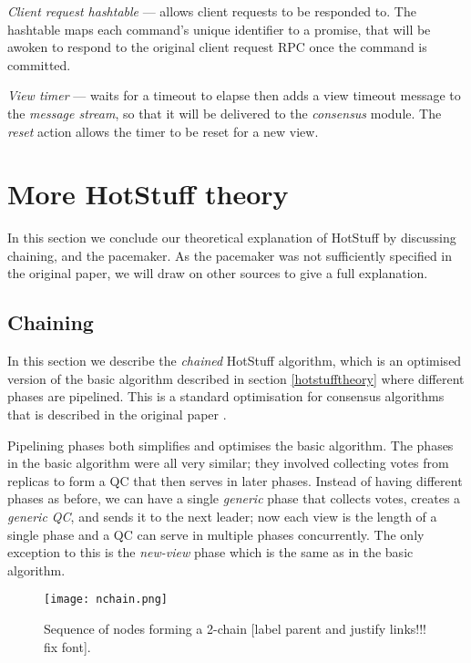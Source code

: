 \begin{description}
	\item \textit{Client request hashtable} --- allows client requests to be responded to. The hashtable maps each command's unique identifier to a promise, that will be awoken to respond to the original client request RPC once the command is committed.
	\item \textit{View timer} --- waits for a timeout to elapse then adds a view timeout message to the \textit{message stream}, so that it will be delivered to the \textit{consensus} module. The \textit{reset} action allows the timer to be reset for a new view.
\end{description}

\section{More HotStuff theory} \label{moretheory}
In this section we conclude our theoretical explanation of HotStuff by discussing chaining, and the pacemaker. As the pacemaker was not sufficiently specified in the original paper, we will draw on other sources to give a full explanation.

\subsection{Chaining} \label{chaining}

In this section we describe the \textit{chained} HotStuff algorithm, which is an optimised version of the basic algorithm described in section \ref{hotstufftheory} where different phases are pipelined. This is a standard optimisation for consensus algorithms that is described in the original paper \cite{yin2019hotstuff}.

Pipelining phases both simplifies and optimises the basic algorithm. The phases in the basic algorithm were all very similar; they involved collecting votes from replicas to form a QC that then serves in later phases. Instead of having different phases as before, we can have a single \textit{generic} phase that collects votes, creates a \textit{generic QC}, and sends it to the next leader; now each view is the length of a single phase and a QC can serve in multiple phases concurrently. The only exception to this is the \textit{new-view} phase which is the same as in the basic algorithm.

\begin{figure}[h!]
\centering
\texttt{[image: nchain.png]}
\caption{Sequence of nodes forming a 2-chain [label parent and justify links!!! fix font].}
\label{nchain}
\end{figure}

